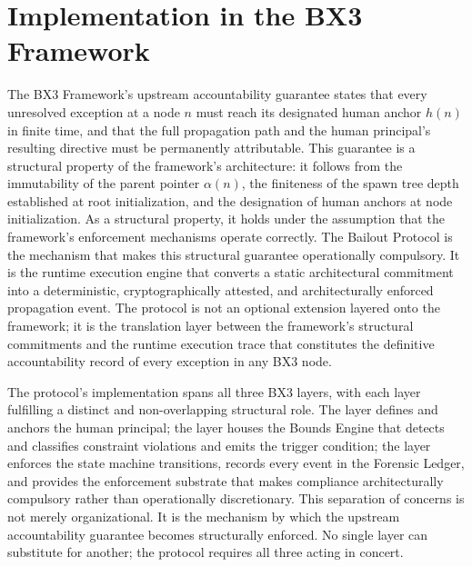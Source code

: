 \section{Implementation in the BX3 Framework}
\label{sec:bailout-implementation}

The BX3 Framework's upstream accountability guarantee states that every
unresolved exception at a node $n$ must reach its designated human anchor
$h(n)$ in finite time, and that the full propagation path and the human
principal's resulting directive must be permanently attributable.
This guarantee is a structural property of the framework's architecture: it
follows from the immutability of the parent pointer $\alpha(n)$, the
finiteness of the spawn tree depth established at root initialization, and
the designation of human anchors at node initialization.  As a structural
property, it holds under the assumption that the framework's enforcement
mechanisms operate correctly.  The Bailout Protocol is the mechanism that
makes this structural guarantee operationally compulsory.  It is the runtime
execution engine that converts a static architectural commitment into a
deterministic, cryptographically attested, and architecturally enforced
propagation event.  The protocol is not an optional extension layered onto
the framework; it is the translation layer between the framework's structural
commitments and the runtime execution trace that constitutes the definitive
accountability record of every exception in any BX3 node.

The protocol's implementation spans all three BX3 layers, with each layer
fulfilling a distinct and non-overlapping structural role.  The \purpose{}
layer defines and anchors the human principal; the \bounds{} layer houses
the Bounds Engine that detects and classifies constraint violations and emits
the trigger condition; the \fact{} layer enforces the state machine
transitions, records every event in the Forensic Ledger, and provides the
enforcement substrate that makes compliance architecturally compulsory rather
than operationally discretionary.  This separation of concerns is not merely
organizational.  It is the mechanism by which the upstream accountability
guarantee becomes structurally enforced.  No single layer can substitute for
another; the protocol requires all three acting in concert.

